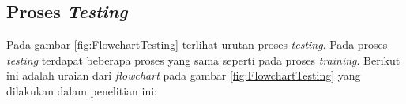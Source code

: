 \subsection{Proses \textit{Testing}}
\begin{adjustbox}{width=1\textwidth}
	\noindent
	\begin{minipage}{\linewidth}
		\label{fig:FlowchartTesting}
	\end{minipage}
\end{adjustbox}
\noindent Pada gambar \ref{fig:FlowchartTesting} terlihat urutan proses \textit{testing}. Pada proses \textit{testing} terdapat beberapa proses yang sama seperti pada proses \textit{training}. Berikut ini adalah uraian dari \textit{flowchart} pada gambar \ref{fig:FlowchartTesting} yang dilakukan dalam penelitian ini:
